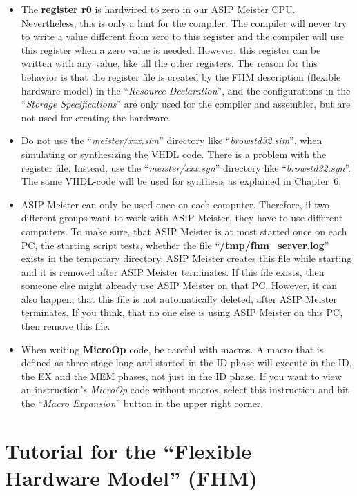 \begin{itemize}
\item
  The \textbf{register r0} is hardwired to zero in our ASIP Meister CPU.
  Nevertheless, this is only a hint for the compiler. The compiler will
  never try to write a value different from zero to this register and
  the compiler will use this register when a zero value is needed.
  However, this register can be written with any value, like all the
  other registers. The reason for this behavior is that the register
  file is created by the FHM description (flexible hardware model) in
  the ``\emph{Resource Declaration}'', and the configurations in the
  ``\emph{Storage Specifications}'' are only used for the compiler and
  assembler, but are not used for creating the hardware.
\item
  Do not use the ``\emph{meister/xxx.sim}'' directory like
  ``\emph{browstd32.sim}'', when simulating or synthesizing the VHDL
  code. There is a problem with the register file. Instead, use the
  ``\emph{meister/xxx.syn}'' directory like ``\emph{browstd32.syn}''.
  The same VHDL-code will be used for synthesis as explained in
  Chapter~6.
\item
  ASIP Meister can only be used once on each computer. Therefore, if two
  different groups want to work with ASIP Meister, they have to use
  different computers. To make sure, that ASIP Meister is at most
  started once on each PC, the starting script tests, whether the file
  ``\textbf{/tmp/fhm\_server.log}'' exists in the temporary directory.
  ASIP Meister creates this file while starting and it is removed after
  ASIP Meister terminates. If this file exists, then someone else might
  already use ASIP Meister on that PC. However, it can also happen, that
  this file is not automatically deleted, after ASIP Meister terminates.
  If you think, that no one else is using ASIP Meister on this PC, then
  remove this file.
\item
  When writing \textbf{MicroOp} code, be careful with macros. A macro
  that is defined as three stage long and started in the ID phase will
  execute in the ID, the EX and the MEM phases, not just in the ID
  phase. If you want to view an instruction's \emph{MicroOp} code
  without macros, select this instruction and hit the ``\emph{Macro
  Expansion}'' button in the upper right corner.
\end{itemize}

\hypertarget{tutorial-for-the-flexible-hardware-model-fhm}{%
\section{Tutorial for the ``Flexible Hardware Model''
(FHM)}\label{tutorial-for-the-flexible-hardware-model-fhm}}

